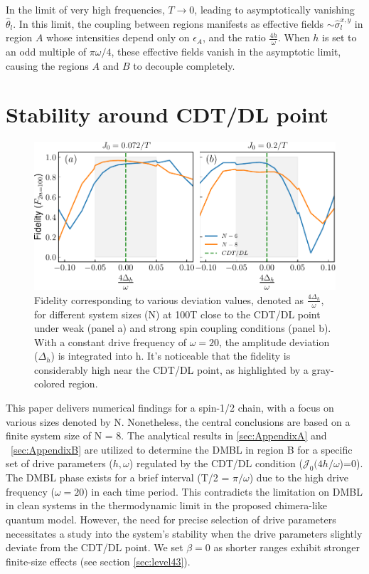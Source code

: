 \documentclass[12pt]{iopart}
\begin{document}
In the limit of very high frequencies, $T\rightarrow 0$, leading to asymptotically vanishing $\hat{\theta}_l$. In this limit, the coupling between regions manifests as effective fields $\sim \hat{\sigma}^{x,y}_l$ in region $A$ whose intensities depend only on $\epsilon_A$, and the ratio $\frac{4h}{\omega}$. When $h$ is set to an odd multiple of $\pi\omega/4$, these effective fields vanish in the asymptotic limit, causing the regions $A$ and $B$ to decouple completely.

\section{\label{sec:AppendixC} Stability around CDT/DL point}
\begin{figure}[t]
	\begin{center}
		\includegraphics[width=12cm]{figure14.pdf}
	\end{center}
	\caption{Fidelity corresponding to various deviation values, denoted as $\frac{4\Delta_h}{\omega}$, for different system sizes (N) at 100T close to the CDT/DL point under weak (panel a) and strong spin coupling conditions (panel b). With a constant drive frequency of $\omega= 20$, the amplitude deviation ($\Delta_h$) is integrated into h. It's noticeable that the fidelity is considerably high near the CDT/DL point, as highlighted by a gray-colored region.}
	\label{Fig:aroundCDT}
\end{figure}
This paper delivers numerical findings for a spin-1/2 chain, with a focus on various sizes denoted by N. Nonetheless, the central conclusions are based on a finite system size of N = 8. The analytical results in \ref{sec:AppendixA} and ~\ref{sec:AppendixB} are utilized to determine the DMBL in region B for a specific set of drive parameters ($h, \omega$) regulated by the CDT/DL condition ($\mathcal{J}_0(4h/\omega$)=0). The DMBL phase exists for a brief interval (T/2 = $\pi/\omega$) due to the high drive frequency ($\omega=20$) in each time period. This contradicts the limitation on DMBL in clean systems in the thermodynamic limit\cite{Mahbub2024} in the proposed chimera-like quantum model. However, the need for precise selection of drive parameters necessitates a study into the system's stability when the drive parameters slightly deviate from the CDT/DL point. We set $\beta = 0$ as shorter ranges exhibit stronger finite-size effects (see section \ref{sec:level43}).
\end{document}
